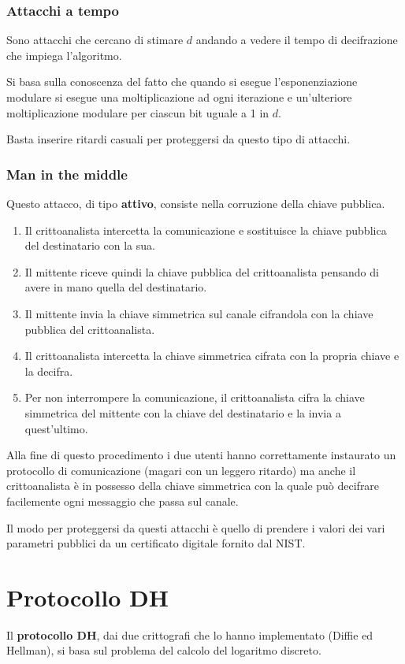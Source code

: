 \subsubsection{Attacchi a tempo}
Sono attacchi che cercano di stimare $d$ andando a vedere il tempo di decifrazione che impiega l'algoritmo.

Si basa sulla conoscenza del fatto che quando si esegue l'esponenziazione modulare si esegue una moltiplicazione
ad ogni iterazione e un'ulteriore moltiplicazione modulare per ciascun bit uguale a 1 in $d$.

Basta inserire ritardi casuali per proteggersi da questo tipo di attacchi.

\subsubsection{Man in the middle}
Questo attacco, di tipo \textbf{attivo}, consiste nella corruzione della chiave pubblica.
\begin{enumerate}
	\item Il crittoanalista intercetta la comunicazione e sostituisce la chiave pubblica del destinatario con la
	      sua.
	\item Il mittente riceve quindi la chiave pubblica del crittoanalista pensando di avere in mano quella del
	      destinatario.
	\item Il mittente invia la chiave simmetrica sul canale cifrandola con la chiave pubblica del crittoanalista.
	\item Il crittoanalista intercetta la chiave simmetrica cifrata con la propria chiave e la decifra.
	\item Per non interrompere la comunicazione, il crittoanalista cifra la chiave simmetrica del mittente con la
	      chiave del destinatario e la invia a quest'ultimo.
\end{enumerate}
Alla fine di questo procedimento i due utenti hanno correttamente instaurato un protocollo di comunicazione (magari
con un leggero ritardo) ma anche il crittoanalista \`e in possesso della chiave simmetrica con la quale pu\`o
decifrare facilemente ogni messaggio che passa sul canale.

Il modo per proteggersi da questi attacchi \`e quello di prendere i valori dei vari parametri pubblici da un
certificato digitale fornito dal NIST.

\section{Protocollo DH}
Il \textbf{protocollo DH}, dai due crittografi che lo hanno implementato (Diffie ed Hellman), si basa sul problema
del calcolo del logaritmo discreto.

